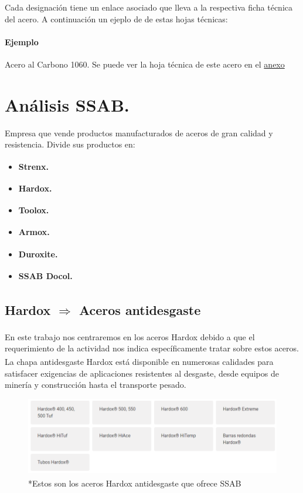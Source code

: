 \documentclass[12pt,a4paper]{article}
\begin{document}
Cada designación tiene un enlace asociado que lleva a la respectiva ficha técnica del acero.
A continuación un ejeplo de de estas hojas técnicas:

\paragraph{Ejemplo}
Acero al Carbono 1060. Se puede ver la hoja técnica de este acero en el \hyperref[anexo]{anexo}

\section{Análisis SSAB.}
Empresa que vende productos manufacturados de aceros de gran calidad y resistencia. Divide sus productos en:
\begin{itemize}
    \item \textbf{Strenx\textsuperscript{\textregistered}.}
    \item \textbf{Hardox\textsuperscript{\textregistered}.}
    \item \textbf{Toolox\textsuperscript{\textregistered}.}
    \item \textbf{Armox\textsuperscript{\textregistered}.}
    \item \textbf{Duroxite\textsuperscript{\textregistered}.}
    \item \textbf{SSAB Docol\textsuperscript{\textregistered}.}
\end{itemize}

\subsection{Hardox\textsuperscript{\textregistered} $\Rightarrow$ Aceros antidesgaste}
En este trabajo nos centraremos en los aceros Hardox\textsuperscript{\textregistered} debido a que el  requerimiento de la actividad nos indica específicamente tratar sobre estos aceros.
La chapa antidesgaste Hardox\textsuperscript{\textregistered} está disponible en numerosas calidades para satisfacer exigencias de aplicaciones resistentes al desgaste, desde equipos de minería y construcción hasta el transporte pesado.

\begin{figure}[H]    
    \centering         
    \includegraphics[width=1\textwidth]{Inagenes para latex/25.png}
    \caption*{*Estos son los aceros Hardox\textsuperscript{\textregistered} antidesgaste que ofrece SSAB}
\end{figure}
\end{document}
